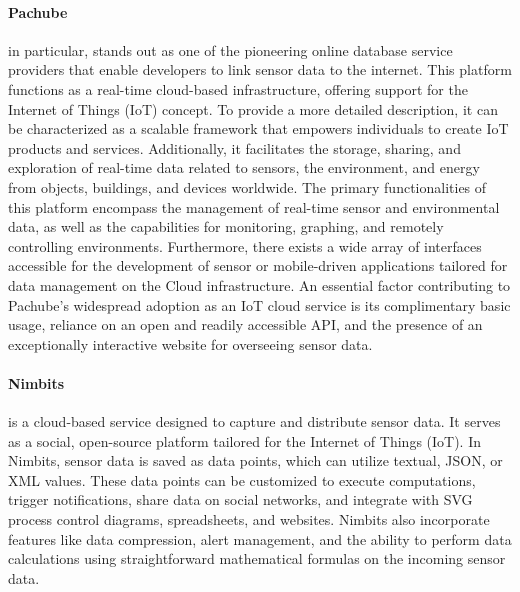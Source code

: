 \documentclass{article}
\begin{document}
\paragraph{Pachube} in particular, stands out as one of the pioneering online database service providers that enable developers to link sensor data to the internet. This platform functions as a real-time cloud-based infrastructure, offering support for the Internet of Things (IoT) concept.
To provide a more detailed description, it can be characterized as a scalable framework that empowers individuals to create IoT products and services. Additionally, it facilitates the storage, sharing, and exploration of real-time data related to sensors, the environment, and energy from objects, buildings, and devices worldwide. The primary functionalities of this platform encompass the management of real-time sensor and environmental data, as well as the capabilities for monitoring, graphing, and remotely controlling environments.
Furthermore, there exists a wide array of interfaces accessible for the development of sensor or mobile-driven applications tailored for data management on the Cloud infrastructure. An essential factor contributing to Pachube's widespread adoption as an IoT cloud service is its complimentary basic usage, reliance on an open and readily accessible API, and the presence of an exceptionally interactive website for overseeing sensor data.

\paragraph{Nimbits} is a cloud-based service designed to capture and distribute sensor data. It serves as a social, open-source platform tailored for the Internet of Things (IoT). In Nimbits, sensor data is saved as data points, which can utilize textual, JSON, or XML values. These data points can be customized to execute computations, trigger notifications, share data on social networks, and integrate with SVG process control diagrams, spreadsheets, and websites. Nimbits also incorporate features like data compression, alert management, and the ability to perform data calculations using straightforward mathematical formulas on the incoming sensor data.
\end{document}
